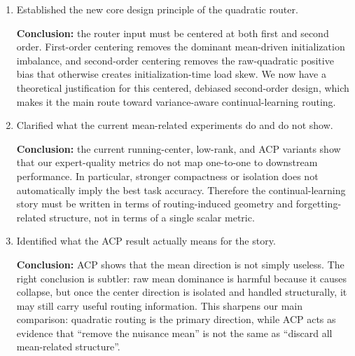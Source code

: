 \documentclass[11pt]{article}
\begin{document}
\begin{enumerate}
    \item Established the new core design principle of the quadratic router.

    \textbf{Conclusion:} the router input must be centered at both first and second order. First-order centering removes the dominant mean-driven initialization imbalance, and second-order centering removes the raw-quadratic positive bias that otherwise creates initialization-time load skew. We now have a theoretical justification for this centered, debiased second-order design, which makes it the main route toward variance-aware continual-learning routing.

    \item Clarified what the current mean-related experiments do and do not show.

    \textbf{Conclusion:} the current running-center, low-rank, and ACP variants show that our expert-quality metrics do not map one-to-one to downstream performance. In particular, stronger compactness or isolation does not automatically imply the best task accuracy. Therefore the continual-learning story must be written in terms of routing-induced geometry and forgetting-related structure, not in terms of a single scalar metric.

    \item Identified what the ACP result actually means for the story.

    \textbf{Conclusion:} ACP shows that the mean direction is not simply useless. The right conclusion is subtler: raw mean dominance is harmful because it causes collapse, but once the center direction is isolated and handled structurally, it may still carry useful routing information. This sharpens our main comparison: quadratic routing is the primary direction, while ACP acts as evidence that ``remove the nuisance mean'' is not the same as ``discard all mean-related structure''.

\end{enumerate}
\end{document}
